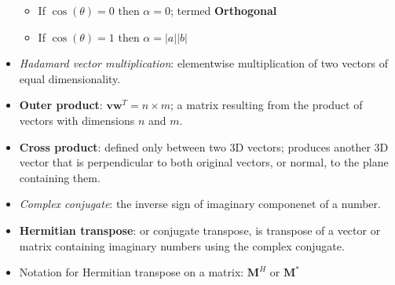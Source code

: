 \documentclass[12pt,a4paper]{article}
\begin{document}
\begin{itemize}
\begin{itemize}
            \item If \(\cos(\theta) = 0\) then \(\alpha = 0\); termed \textbf{Orthogonal}
            \item If \(\cos(\theta) = 1\) then \(\alpha = |a||b|\)
        \end{itemize}
    \item \textit{Hadamard vector multiplication}: elementwise multiplication of two vectors of equal dimensionality.
    \item \textbf{Outer product}: {\color{o-Sun}\(\bm{vw}^T = n \times m\)}; a matrix resulting from the product of vectors with dimensions \(n\) and \(m\).
    \item \textbf{Cross product}: defined only between {\color{o-Sun}two 3D} vectors; produces another 3D vector that is perpendicular to both original vectors, or {\color{o-Sun}normal}, to the plane containing them.
    \item \textit{Complex conjugate}: the inverse sign of imaginary componenet of a number.
    \item \textbf{Hermitian transpose}: or conjugate transpose, is transpose of a vector or matrix containing imaginary numbers using the complex conjugate. 
    \item Notation for Hermitian transpose on a matrix: \(\bm{M}^H\) or \(\bm{M}^*\)
\end{itemize}
\end{document}

